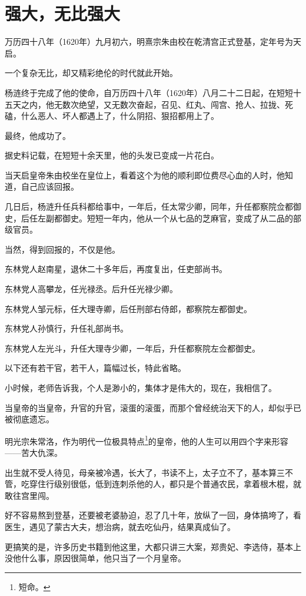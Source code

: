 \section{强大，无比强大}
\ifnum{}
	\begin{multicols}{\theparacolNo}
\fi
万历四十八年（1620年）九月初六，明熹宗朱由校在乾清宫正式登基，定年号为天启。

一个复杂无比，却又精彩绝伦的时代就此开始。

杨涟终于完成了他的使命，自万历四十八年（1620年）八月二十二日起，在短短十五天之内，他无数次绝望，又无数次奋起，召见、红丸、闯宫、抢人、拉拢、死磕，什么恶人、坏人都遇上了，什么阴招、狠招都用上了。

最终，他成功了。

据史料记载，在短短十余天里，他的头发已变成一片花白。

当天启皇帝朱由校坐在皇位上，看着这个为他的顺利即位费尽心血的人时，他知道，自己应该回报。

几日后，杨涟升任兵科都给事中，一年后，任太常少卿，同年，升任都察院佥都御史，后任左副都御史。短短一年内，他从一个从七品的芝麻官，变成了从二品的部级官员。

当然，得到回报的，不仅是他。

东林党人赵南星，退休二十多年后，再度复出，任吏部尚书。

东林党人高攀龙，任光禄丞。后升任光禄少卿。

东林党人邹元标，任大理寺卿，后任刑部右侍郎，都察院左都御史。

东林党人孙慎行，升任礼部尚书。

东林党人左光斗，升任大理寺少卿，一年后，升任都察院左佥都御史。

以下还有若干官，若干人，篇幅过长，特此省略。

小时候，老师告诉我，个人是渺小的，集体才是伟大的，现在，我相信了。

当皇帝的当皇帝，升官的升官，滚蛋的滚蛋，而那个曾经统治天下的人，却似乎已被彻底遗忘。

明光宗朱常洛，作为明代一位极具特点\footnote{短命。}的皇帝，他的人生可以用四个字来形容——苦大仇深。

出生就不受人待见，母亲被冷遇，长大了，书读不上，太子立不了，基本算三不管，吃穿住行级别很低，低到连刺杀他的人，都只是个普通农民，拿着根木棍，就敢往宫里闯。

好不容易熬到登基，还要被老婆胁迫，忍了几十年，放纵了一回，身体搞垮了，看医生，遇见了蒙古大夫，想治病，就去吃仙丹，结果真成仙了。

更搞笑的是，许多历史书籍到他这里，大都只讲三大案，郑贵妃、李选侍，基本上没他什么事，原因很简单，他只当了一个月皇帝。


\end{multicols}
